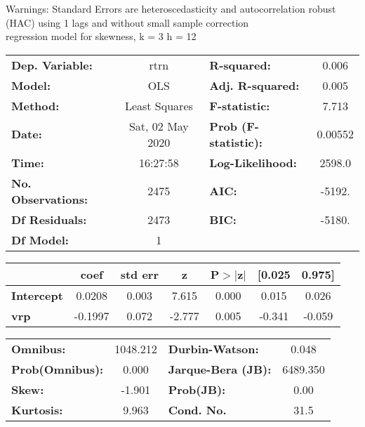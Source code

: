 Warnings: \newline
 [1] Standard Errors are heteroscedasticity and autocorrelation robust (HAC) using 1 lags and without small sample correction\\ 

regression model for skewness, k = 3 h = 12\begin{center}
\begin{tabular}{lclc}
\toprule
\textbf{Dep. Variable:}    &       rtrn       & \textbf{  R-squared:         } &     0.006   \\
\textbf{Model:}            &       OLS        & \textbf{  Adj. R-squared:    } &     0.005   \\
\textbf{Method:}           &  Least Squares   & \textbf{  F-statistic:       } &     7.713   \\
\textbf{Date:}             & Sat, 02 May 2020 & \textbf{  Prob (F-statistic):} &  0.00552    \\
\textbf{Time:}             &     16:27:58     & \textbf{  Log-Likelihood:    } &    2598.0   \\
\textbf{No. Observations:} &        2475      & \textbf{  AIC:               } &    -5192.   \\
\textbf{Df Residuals:}     &        2473      & \textbf{  BIC:               } &    -5180.   \\
\textbf{Df Model:}         &           1      & \textbf{                     } &             \\
\bottomrule
\end{tabular}
\begin{tabular}{lcccccc}
                   & \textbf{coef} & \textbf{std err} & \textbf{z} & \textbf{P$> |$z$|$} & \textbf{[0.025} & \textbf{0.975]}  \\
\midrule
\textbf{Intercept} &       0.0208  &        0.003     &     7.615  &         0.000        &        0.015    &        0.026     \\
\textbf{vrp}       &      -0.1997  &        0.072     &    -2.777  &         0.005        &       -0.341    &       -0.059     \\
\bottomrule
\end{tabular}
\begin{tabular}{lclc}
\textbf{Omnibus:}       & 1048.212 & \textbf{  Durbin-Watson:     } &    0.048  \\
\textbf{Prob(Omnibus):} &   0.000  & \textbf{  Jarque-Bera (JB):  } & 6489.350  \\
\textbf{Skew:}          &  -1.901  & \textbf{  Prob(JB):          } &     0.00  \\
\textbf{Kurtosis:}      &   9.963  & \textbf{  Cond. No.          } &     31.5  \\
\bottomrule
\end{tabular}
\end{center}

